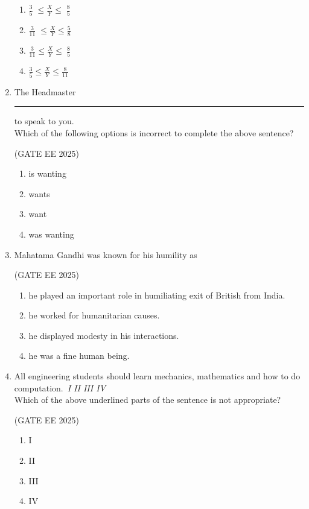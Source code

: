 \documentclass[journal,12pt,onecolumn]{IEEEtran}
\theoremstyle{remark}
\begin{document}
\begin{enumerate}
    \begin{enumerate}
        \item $\tfrac{3}{5}\;\le \tfrac{X}{Y}\le\;\tfrac{8}{5}$ 
        \item $\tfrac{3}{11}\;\le \tfrac{X}{Y}\le\tfrac{5}{8}
        $ 
        \item $\tfrac{3}{11}\le \tfrac{X}{Y}\le\ \tfrac{8}{5}$ 
        \item $\tfrac{3}{5}\le \tfrac{X}{Y}\le \tfrac{8}{11}$
    \end{enumerate}

\item The Headmaster \rule{2cm}{0.15mm} to speak to you.\\
Which of the following options is incorrect to complete the above sentence?\

\hfill(GATE EE 2025)

\begin{enumerate}
    \item is wanting 
    \item wants 
    \item want
    \item was wanting
\end{enumerate}

\item Mahatama Gandhi was known for his humility as\

\hfill(GATE EE 2025)

\begin{enumerate}
    \item he played an important role in humiliating exit of British from India.
    \item he worked for humanitarian causes.
    \item he displayed modesty in his interactions.
    \item he was a fine human being.
\end{enumerate}

\item All engineering students should learn mechanics, mathematics and how to do computation.\
\emph{I\quad\quad\quad\; II\quad\quad\quad\; III\quad\quad\quad\; IV}\\
Which of the above underlined parts of the sentence is not appropriate?\

\hfill(GATE EE 2025)

\begin{multicols}{4}
\begin{enumerate}
    \item I
    \item II
    \item III
    \item IV
\end{enumerate}
\end{multicols}


\end{enumerate}
\end{document}
